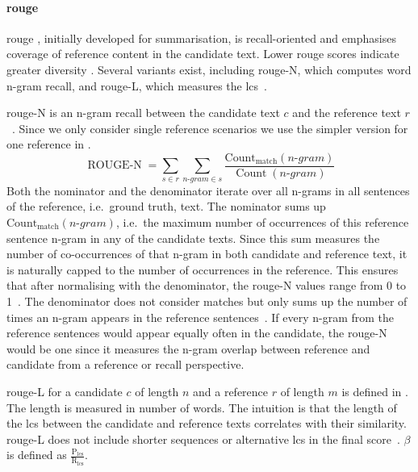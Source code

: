 
\paragraph{\ac{rouge}}
\ac{rouge} \citep{lin_rouge_2004}, initially developed for summarisation, is recall-oriented and emphasises coverage of reference content in the candidate text. 
Lower \ac{rouge} scores indicate greater diversity \citep{kurt_pehlivanoglu_comparative_2024}.
Several variants exist, including \ac{rouge}-N, which computes word n-gram recall, and \ac{rouge}-L, which measures the \ac{lcs}~\citep{zhou_paraphrase_2021,palivela_optimization_2021,kurt_pehlivanoglu_comparative_2024}. 

\ac{rouge}-N is an n-gram recall between the candidate text $c$ and the reference text $r$~\citep{lin_rouge_2004}.
Since we only consider single reference scenarios we use the simpler version for one reference in .
\begin{equation}
    \operatorname{ROUGE-N} = \sum_{s \in r}\sum_{n \text{-} gram \in s} \frac{\operatorname{Count_{match}}(n \text{-} gram)}{\operatorname{Count}(n \text{-} gram)}
\label{eq:rouge_n}
\end{equation}
Both the nominator and the denominator iterate over all n-grams in all sentences of the reference, i.e.\ ground truth, text.
The nominator sums up $\operatorname{Count_{match}}(n \text{-} gram)$, i.e.\ the maximum number of occurrences of this reference sentence n-gram in any of the candidate texts.
Since this sum measures the number of co-occurrences of that n-gram in both candidate and reference text, it is naturally capped to the number of occurrences in the reference.
This ensures that after normalising with the denominator, the \ac{rouge}-N values range from 0 to 1~\citep{kurt_pehlivanoglu_comparative_2024}.
The denominator does not consider matches but only sums up the number of times an n-gram appears in the reference sentences~\citep{lin_rouge_2004}.
If every n-gram from the reference sentences would appear equally often in the candidate, the \ac{rouge}-N would be one since it measures the n-gram overlap between reference and candidate from a reference or recall perspective.

\ac{rouge}-L for a candidate $c$ of length $n$ and a reference $r$ of length $m$ is defined in .
The length is measured in number of words.
The intuition is that the length of the \ac{lcs} between the candidate and reference texts correlates with their similarity.
\ac{rouge}-L does not include shorter sequences or alternative \ac{lcs} in the final score~\citep{lin_rouge_2004}.
$\beta$ is defined as $\frac{\mathrm{P_{lcs}}}{\mathrm{R_{lcs}}}$.

